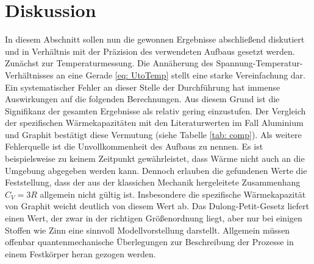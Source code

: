 \section{Diskussion}
In diesem Abschnitt sollen nun die gewonnen Ergebnisse abschließend diskutiert und in
Verhältnis mit der Präzision des verwendeten Aufbaus gesetzt werden. \\
Zunächst zur Temperaturmessung. Die Annäherung des Spannung-Temperatur-Verhältnisses
an eine Gerade \eqref{eq: UtoTemp} stellt eine starke Vereinfachung dar. Ein systematischer
Fehler an dieser Stelle der Durchführung hat immense Auswirkungen auf die folgenden Berechnungen.
Aus diesem Grund ist die Signifikanz der gesamten Ergebnisse als relativ gering einzustufen.
Der Vergleich der spezifischen Wärmekapazitäten mit den Literaturwerten im Fall Aluminium und Graphit bestätigt diese Vermutung (siehe
Tabelle \ref{tab: comp}). Als weitere Fehlerquelle ist die Unvollkommenheit des Aufbaus zu nennen.
Es ist beispielsweise zu keinem Zeitpunkt gewährleistet, dass Wärme nicht auch an die Umgebung abgegeben werden kann.
Dennoch erlauben die gefundenen Werte die Feststellung, dass der aus der klassichen Mechanik hergeleitete Zusammenhang $C_V = 3R$ allgemein
nicht gültig ist. Insbesondere die spezifische Wärmekapazität von Graphit weicht deutlich von diesem Wert ab. Das Dulong-Petit-Gesetz liefert %
einen Wert, der zwar in der richtigen Größenordnung liegt, aber nur bei einigen Stoffen wie Zinn eine sinnvoll Modellvorstellung darstellt. Allgemein
müssen offenbar quantenmechanische Überlegungen zur Beschreibung der Prozesse in einem Festkörper heran gezogen werden.
